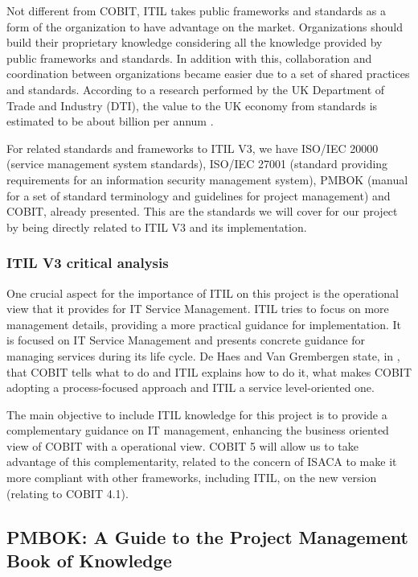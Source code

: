 \par Not different from COBIT,  ITIL takes public frameworks and standards as a form of the organization to have advantage on the market. Organizations should build their proprietary knowledge considering  all the knowledge provided by public frameworks and standards. In addition with this, collaboration and coordination between organizations became easier due to a set of shared practices and standards. According to a research performed by the UK Department of Trade and Industry (DTI), the value to the UK economy from standards is estimated to be about  billion per annum \cite{McNeillis01112005}.\par
For related standards and frameworks to ITIL V3, we have ISO/IEC 20000 (service management system standards), ISO/IEC 27001 (standard providing requirements for an information security management system), PMBOK (manual for a set of standard terminology and guidelines for project management)\cite{pmbok5} and COBIT\cite{2012cobit}, already presented. This are the standards we will cover for our project by being directly related to ITIL V3 and its implementation.


\subsubsection{ITIL V3 critical analysis}

One crucial aspect for the importance of ITIL on this project is the operational view that it provides for IT Service Management. ITIL tries to focus on more management details, providing a more practical guidance for implementation. It is focused on IT Service Management and presents concrete guidance for managing services during its life cycle. De Haes and Van Grembergen state, in \cite{ITGovAndMech}, that COBIT tells what to do and ITIL explains how to do it, what makes COBIT adopting a process-focused approach and ITIL a service level-oriented one.\par
The main objective to include ITIL knowledge for this project is to provide a complementary guidance on IT management, enhancing the business oriented view of COBIT with a operational view. COBIT 5 will allow us to take advantage of this complementarity, related to the concern of ISACA to make it more compliant with other frameworks, including ITIL, on the new version (relating to COBIT 4.1). 

\subsection{PMBOK: A Guide to the Project Management Book of Knowledge}

